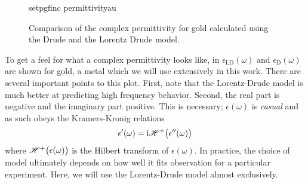\begin{figure}[ht]
\centering
{setpgfinc}
{permittivityau}
\caption{Comparison of the complex permittivity for gold calculated using the Drude
and the Lorentz Drude model.}
\label{fig:permittivityau}
\end{figure}

To get a feel for what a complex permittivity looks like, in
 $\epsilon_\mathrm{LD}(\omega)$ and
$\epsilon_\mathrm{D}(\omega)$ are shown for gold, a metal which we will use
extensively in this work.  There are several important points to this plot.
First, note that the Lorentz-Drude model is much better at predicting high
frequency behavior.  Second, the real part is negative and the
imaginary part positive.  This is necessary; $\epsilon(\omega)$ is
\textit{casual} and as such obeys the Kramers-Kronig relations
\begin{align}
\epsilon^\prime(\omega)={\mathrm{i}} {\mathscr{H}^{+}\bigl(\epsilon^{\prime\prime}(\omega)\bigr)}
\end{align}
where ${\mathscr{H}^{+}\bigl(\epsilon(\omega)\bigr)}$ is the Hilbert transform of
$\epsilon(\omega)$.  In practice, 
the choice of model ultimately depends on how well it fits observation for
a particular experiment.  Here, we will use the Lorentz-Drude model almost
exclusively.
